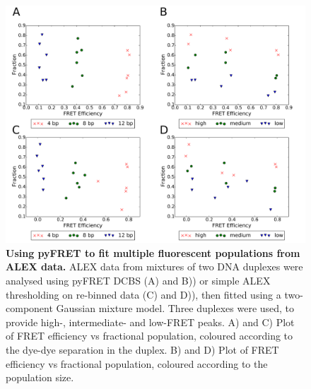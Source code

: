 \begin{figure}[!ht]
   \begin{center}
      \includegraphics*[clip=true, width=6in]{pyFRET/ratios.pdf}
      \caption{{\bf Using pyFRET to fit multiple fluorescent populations from ALEX data.} ALEX data from mixtures of two DNA duplexes were analysed using pyFRET DCBS (A) and B)) or simple ALEX thresholding on re-binned data (C) and D)), then fitted using a two-component Gaussian mixture model. Three duplexes were used, to provide high-, intermediate- and low-FRET peaks. A) and C) Plot of FRET efficiency vs fractional population, coloured according to the dye-dye separation in the duplex. B) and D) Plot of FRET efficiency vs fractional population, coloured according to the population size.}
      \label{fig:ratios}
   \end{center}
\end{figure}

